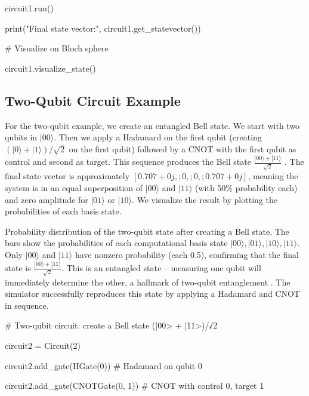 \documentclass[%
oneside,                 %
final,                   %
10pt]{article}
\begin{document}
circuit1.run()

print("Final state vector:", circuit1.get_statevector())

# Visualize on Bloch sphere

circuit1.visualize_state()


\epycod


\subsection{Two-Qubit Circuit Example}

For the two-qubit example, we create an entangled Bell state. We start
with two qubits in $|00\rangle$. Then we apply a Hadamard on the first
qubit (creating $(|0\rangle+|1\rangle)/\sqrt{2}$ on the first qubit)
followed by a CNOT with the first qubit as control and second as
target. This sequence produces the Bell state
$\frac{|00\rangle + |11\rangle}{\sqrt{2}}$ . The final state vector is approximately
$[0.707+0j,;0,;0,;0.707+0j]$, meaning the system is in an equal
superposition of $|00\rangle$ and $|11\rangle$ (with 50\% probability
each) and zero amplitude for $|01\rangle$ or $|10\rangle$. We
visualize the result by plotting the probabilities of each basis
state.

Probability distribution of the two-qubit state after creating a Bell
state. The bars show the probabilities of each computational basis
state $|00\rangle,|01\rangle,|10\rangle,|11\rangle$. Only $|00\rangle$
and $|11\rangle$ have nonzero probability (each 0.5), confirming that
the final state is $\frac{|00\rangle + |11\rangle}{\sqrt{2}}$. This is
an entangled state – measuring one qubit will immediately determine
the other, a hallmark of two-qubit entanglement . The simulator
successfully reproduces this state by applying a Hadamard and CNOT in
sequence.

















\bpycod
# Two-qubit circuit: create a Bell state (|00> + |11>)/√2

circuit2 = Circuit(2)

circuit2.add_gate(HGate(0))       # Hadamard on qubit 0

circuit2.add_gate(CNOTGate(0, 1)) # CNOT with control 0, target 1
\end{document}
